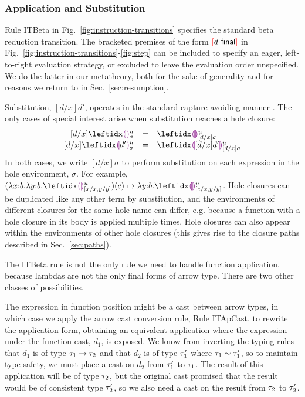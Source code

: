 
\subsubsection{Application and Substitution} 
Rule {ITBeta} in Fig.~\ref{fig:instruction-transitions} specifies the standard beta reduction transition. 
The bracketed premises of the form ${\textcolor{red}[}d~\mathsf{final}{\textcolor{red}]}$ in Fig.~\ref{fig:instruction-transitions}-\ref{fig:step} can be included to specify an eager, left-to-right evaluation strategy, 
or excluded to leave the evaluation order unspecified. 
We do the latter in our metatheory, both for the sake of generality and for reasons we return to in Sec.~\ref{sec:resumption}.

Substitution, $[d/x]d'$, operates in the standard capture-avoiding manner \cite{pfpl}. 
The only cases of special interest arise when substitution reaches a hole closure:
\[
\begin{array}{rcl}
  [d/x]\dehole{u}{\sigma}{} & = & \dehole{u}{[d/x]\sigma}{} \\%
  \substitute{d}{x}{\dhole{d'}{u}{\sigma}{}} & = & \dhole{[d/x]d'}{u}{[d/x]\sigma}{}
\end{array}
\]
In both cases, we write $[d/x]\sigma$ to perform substitution on each expression in the hole environment, $\sigma$. 
For example, $\stepsToD{}{\hap{(\halam{x}{b}{\halam{y}{b}{\dehole{u}{[x/x, y/y]}{}}})}{c}}{\halam{y}{b}{\dehole{u}{[c/x, y/y]}{}}}$. 
Hole closures can be duplicated like any other term by substitution, and the environments of different closures for the same hole name can differ, e.g. because a function with a hole closure in its body is applied multiple times.%
Hole closures can also appear within the environments of other hole closures (this gives rise to the closure paths described in Sec.~\ref{sec:paths}).

The ITBeta rule is not the only rule we need to handle function application, because lambdas are not the only final forms of arrow type. There are two other classes of possibilities. 

The expression in function position might be a cast between arrow types, in which case we apply the arrow cast conversion rule, Rule {ITApCast}, to rewrite the application form, obtaining an equivalent application where the expression under the function cast, $d_1$, is exposed. 
We know from inverting the typing rules that $d_1$ is of type $\tau_1 \rightarrow \tau_2$ and that $d_2$ is of type $\tau_1'$ where $\tau_1 \sim \tau_1'$, so to maintain type safety, we must place a cast on $d_2$ from  $\tau_1'$ to $\tau_1$. 
The result of this application will be of type $\tau_2$, but the original cast promised that the result would be of consistent type $\tau_2'$, so we also need a cast on the result from $\tau_2$ to $\tau_2'$.

